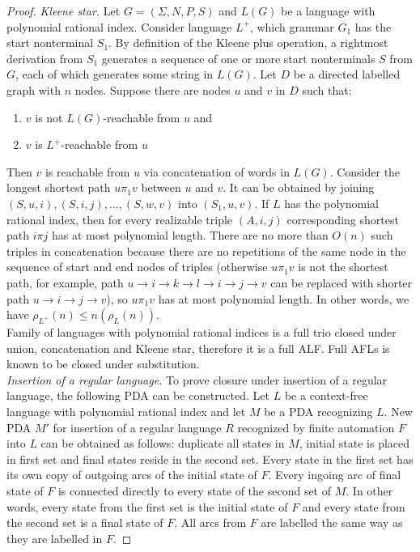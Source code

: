 \begin{proof}
\textit{Kleene star.} Let $G = (\Sigma, N, P, S)$ and $L(G)$ be a language with polynomial rational index. Consider language $L^{+}$, which grammar $G_1$ has the start nonterminal $S_1$. By definition of the Kleene plus operation, a rightmost derivation from $S_1$ generates a sequence of one or more start nonterminals $S$ from $G$, each of which generates some string in $L(G)$. Let $D$ be a directed labelled graph with $n$ nodes. Suppose there are nodes $u$ and $v$ in $D$ such that:
\begin{enumerate}
\item $v$ is not $L(G)$-reachable from $u$ and
\item $v$ is  $L^+$-reachable from $u$
\end{enumerate}
Then $v$ is reachable from $u$ via concatenation of words in $L(G)$. Consider the longest shortest path $u\pi_1 v$ between $u$ and $v$. It can be obtained by joining $(S, u, i), (S, i, j), ..., (S, w, v)$ into $(S_1, u, v)$.  If $L$ has the polynomial rational index, then for every realizable triple $(A, i, j)$ corresponding shortest path $i \pi j$ has at most polynomial length. There are no more than $O(n)$ such triples in concatenation because there are no repetitions of the same node in the sequence of start and end nodes of triples (otherwise $u\pi_1 v$ is not the shortest path, for example, path $u \rightarrow i \rightarrow k \rightarrow l \rightarrow i \rightarrow j \rightarrow v$ can be replaced with shorter path $u \rightarrow i  \rightarrow j \rightarrow v$), so $u\pi_1 v$ has at most polynomial length. In other words, we have $\rho_{L^+}(n) \le n(\rho_L(n))$.
\\
Family of languages with polynomial rational indices is a full trio closed under union, concatenation and Kleene star, therefore it is a full ALF. Full AFLs is known to be closed under substitution.
\\
\textit{Insertion of a regular language.} To prove closure under insertion of a regular language, the following PDA can be constructed. Let $L$ be a context-free language with polynomial rational index and let $M$ be a PDA recognizing $L$. New PDA $M'$ for insertion of a regular language $R$ recognized by finite automation $F$ into $L$ can be obtained as follows: duplicate all states in $M$, initial state is placed in first set and final states reside in the second set. Every state in the first set has its own copy of outgoing arcs of the initial state of $F$. Every ingoing arc of final state of $F$ is connected directly to every state of the second set of $M$. In other words, every state from the first set is the initial state of $F$ and every state from the second set is a final state of $F$. All arcs from $F$ are labelled the same way as they are labelled in $F$.

\end{proof}
